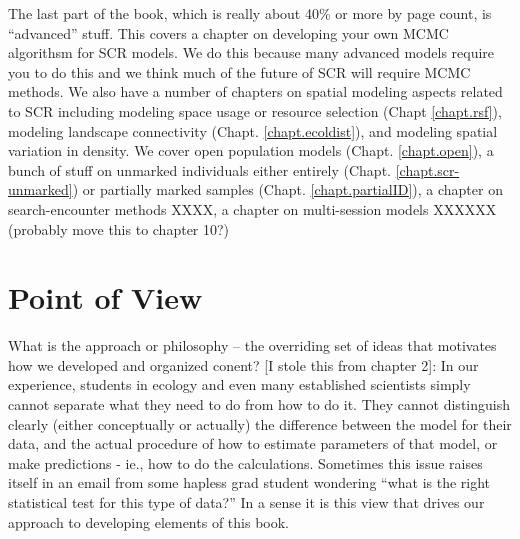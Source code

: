 The last part of the book, which is really about 40\% or more by page
count, is ``advanced'' stuff. This covers a chapter on developing your
own MCMC algorithsm for SCR models. We do this because many advanced
models require you to do this and we think much of the future of SCR
will require MCMC methods. 
We also have a number of chapters on spatial modeling aspects related
to SCR including modeling 
space usage or resource selection (Chapt \ref{chapt.rsf}), modeling
landscape connectivity (Chapt. \ref{chapt.ecoldist}), and modeling
spatial variation in density. 
We cover open population models (Chapt. \ref{chapt.open}),
a bunch of stuff on unmarked individuals either entirely (Chapt. \ref{chapt.scr-unmarked})
or partially marked samples (Chapt. \ref{chapt.partialID}), 
a chapter on search-encounter methods XXXX, a chapter on multi-session
models XXXXXX (probably move this to chapter 10?)


\section*{Point of View}

What is the approach or philosophy -- the overriding set of ideas that
motivates how we developed and organized conent?
[I stole this from chapter 2]:
In our experience, students in ecology and even many established
scientists simply cannot separate what they need to do from how to do
it.  They cannot distinguish clearly (either conceptually or actually)
the difference between the model for their data, and the actual
procedure of how to estimate parameters of that model, or make
predictions - ie., how to do the calculations. Sometimes this issue
raises itself in an email from some hapless grad student wondering
``what is the right statistical test for this type of data?''  In a
sense it is this view that drives our approach to developing elements
of this book.

